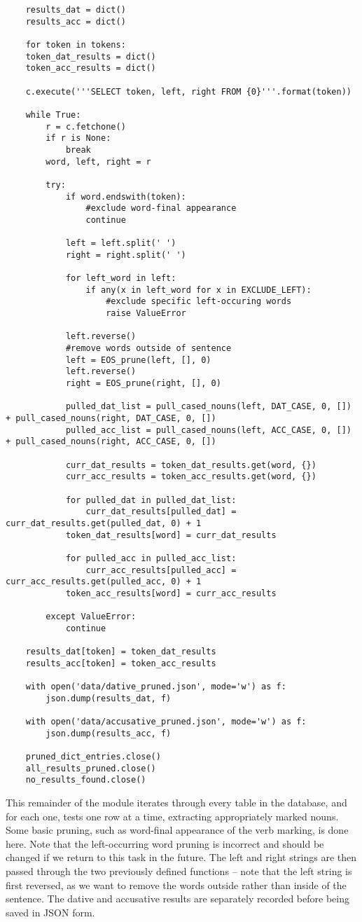 \documentclass{article}      %
\begin{document}
	\begin{verbatim}
	results_dat = dict()
	results_acc = dict()
	
	for token in tokens:
	token_dat_results = dict()
	token_acc_results = dict()
	
	c.execute('''SELECT token, left, right FROM {0}'''.format(token))
	
	while True:
		r = c.fetchone()
		if r is None:
			break
		word, left, right = r
		
		try:
			if word.endswith(token):
				#exclude word-final appearance
				continue
			
			left = left.split(' ')
			right = right.split(' ')
			
			for left_word in left:
				if any(x in left_word for x in EXCLUDE_LEFT):
					#exclude specific left-occuring words
					raise ValueError
			
			left.reverse()
			#remove words outside of sentence
			left = EOS_prune(left, [], 0)
			left.reverse()
			right = EOS_prune(right, [], 0)
			
		    pulled_dat_list = pull_cased_nouns(left, DAT_CASE, 0, []) + pull_cased_nouns(right, DAT_CASE, 0, [])
			pulled_acc_list = pull_cased_nouns(left, ACC_CASE, 0, []) + pull_cased_nouns(right, ACC_CASE, 0, [])
			
			curr_dat_results = token_dat_results.get(word, {})
			curr_acc_results = token_acc_results.get(word, {})
			
			for pulled_dat in pulled_dat_list:
				curr_dat_results[pulled_dat] = curr_dat_results.get(pulled_dat, 0) + 1
			token_dat_results[word] = curr_dat_results
			
			for pulled_acc in pulled_acc_list:
				curr_acc_results[pulled_acc] = curr_acc_results.get(pulled_acc, 0) + 1
			token_acc_results[word] = curr_acc_results
			
		except ValueError:
			continue
			
	results_dat[token] = token_dat_results
	results_acc[token] = token_acc_results
	
	with open('data/dative_pruned.json', mode='w') as f:
		json.dump(results_dat, f)
	
	with open('data/accusative_pruned.json', mode='w') as f:
		json.dump(results_acc, f)
	
	pruned_dict_entries.close()
	all_results_pruned.close()
	no_results_found.close()
	\end{verbatim}
	
	This remainder of the module iterates through every table in the database, and for each one, tests one row at a time, extracting appropriately marked nouns. Some basic pruning, such as word-final appearance of the verb marking, is done here. Note that the left-occurring word pruning is incorrect and should be changed if we return to this task in the future. The left and right strings are then passed through the two previously defined functions -- note that the left string is first reversed, as we want to remove the words outside rather than inside of the sentence. The dative and accusative results are separately recorded before being saved in JSON form.
	
\end{document}

